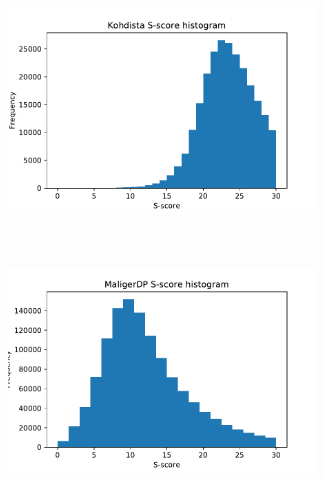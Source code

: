 \begin{figure}[h!t]
\begin{subfigure}[b]{0.5\textwidth}
\includegraphics[width=0.9\textwidth]{gcsa_paper/content/figures/shist_kohdista.pdf}
\end{subfigure}~\begin{subfigure}[b]{0.5\textwidth}
\includegraphics[width=0.9\textwidth]{gcsa_paper/content/figures/shist_malignerdp.pdf}
\end{subfigure}


\end{figure}
